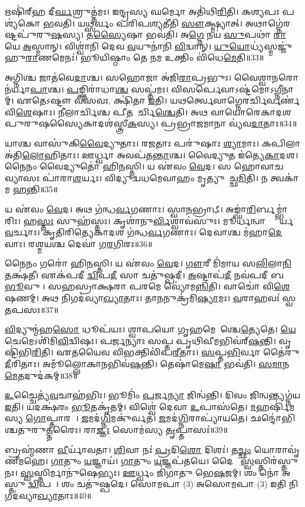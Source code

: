 𑌋𑌷𑌿॑𑌰𑍍‌𑌹 𑌦𑍀\ul{𑌰𑍍𑌘}𑌶𑍍𑌰𑍁𑌤𑍍𑌤॑𑌮𑌃। 𑌇𑌨𑍍𑌦𑍍𑌰𑌸𑍍𑌯 𑌘𑌰𑍍𑌮𑍋 𑌅𑌤𑌿॑𑌥𑌿\ul{𑌰𑌿}𑌤𑌿। 
𑌕𑌶𑍍𑌯𑌪𑌃 𑌪𑌶𑍍𑌯॑𑌕𑍋 \ul{𑌭}𑌵𑌤𑌿। 𑌯𑌥𑍍𑌸𑌰𑍍𑌵𑌂 𑌪𑌰𑌿𑌪𑌶𑍍𑌯𑌤𑍀॑𑌤𑌿 \ul{𑌸𑍗}𑌕𑍍𑌷𑍍𑌮𑍍𑌯𑌾𑌤𑍍‌। 
𑌅𑌥𑌾𑌗𑍍𑌨𑍇॑𑌰𑌷𑍍𑌟𑌪𑍁॑𑌰𑍁\ul{𑌷}𑌸𑍍𑌯। 𑌤\ul{𑌸𑍍𑌯𑍈}𑌷𑌾 𑌭𑌵॑𑌤𑌿। 
𑌅\ul{𑌗𑍍𑌨𑍇} 𑌨𑌯॑ \ul{𑌸𑍁}𑌪𑌥𑌾॑ \ul{𑌰𑌾}𑌯𑍇 \ul{𑌅}𑌸𑍍𑌮𑌾𑌨𑍍‌। 𑌵𑌿𑌶𑍍𑌵𑌾॑𑌨𑌿 𑌦𑍇𑌵 \ul{𑌵}𑌯𑍁𑌨𑌾॑𑌨𑌿 \ul{𑌵𑌿}𑌦𑍍𑌵𑌾𑌨𑍍‌। 
\ul{𑌯𑍁}\ul{𑌯𑍋}𑌧𑍍𑌯॑𑌸𑍍𑌮𑌜𑍍𑌜𑍁॑𑌹𑍁\ul{𑌰𑌾}𑌣𑌮𑍇𑌨𑌃॑। 𑌭𑍂𑌯𑌿𑌷𑍍𑌠𑌾𑌂 𑌤𑍇 𑌨𑌮 𑌉𑌕𑍍𑌤𑌿𑌂 𑌵𑌿॑𑌧𑍇\ul{𑌮𑍇}𑌤𑌿॥33॥\anuvakamend


𑌅𑌗𑍍𑌨𑌿𑌶𑍍𑌚 𑌜𑌾𑌤॑𑌵𑍇\ul{𑌦𑌾}𑌶𑍍𑌚। 𑌸𑌹𑍋𑌜𑌾 𑌅॑𑌜𑌿\ul{𑌰𑌾}𑌪𑍍𑌰𑌭𑍁𑌃। 𑌵𑍈𑌶𑍍𑌵𑌾𑌨𑌰𑍋 𑌨॑𑌰𑍍𑌯𑌾\ul{𑌪𑌾}𑌶𑍍𑌚। 
\ul{𑌪}𑌙𑍍𑌕𑍍𑌤𑌿𑌰𑌾॑𑌧𑌾\ul{𑌶𑍍𑌚} 𑌸𑌪𑍍𑌤॑𑌮𑌃। 𑌵𑌿𑌸𑌰𑍍𑌪𑍇𑌵𑌾𑌽𑌷𑍍𑌟॑𑌮𑍋𑌽\ul{𑌗𑍍𑌨𑍀}𑌨𑌾𑌮𑍍‌। 
𑌏𑌤𑍇𑌽𑌷𑍍𑌟𑍗 𑌵𑌸𑌵𑌃, 𑌕𑍍𑌷𑌿॑𑌤𑌾 \ul{𑌇}𑌤𑌿। 𑌯𑌥𑌰𑍍𑌤𑍍𑌵𑍇𑌵𑌾𑌗𑍍𑌨𑍇𑌰𑌰𑍍𑌚𑌿𑌰𑍍𑌵𑌰𑍍𑌣॑𑌵𑌿\ul{𑌶𑍇}𑌷𑌾𑌃। 
𑌨𑍀𑌲𑌾𑌰𑍍𑌚𑌿𑌶𑍍𑌚 𑌪𑍀𑌤𑌕𑌾᳚𑌰𑍍𑌚𑌿\ul{𑌶𑍍𑌚𑍇}𑌤𑌿। 𑌅𑌥 𑌵𑌾𑌯𑍋𑌰𑍇𑌕𑌾𑌦𑌶𑌪𑍁𑌰𑍁𑌷𑌸𑍍𑌯𑍈𑌕𑌾\-𑌦𑌶॑𑌸𑍍𑌤𑍍𑌰𑍀\ul{𑌕}𑌸𑍍𑌯। 
𑌪𑍍𑌰𑌭𑍍𑌰𑌾𑌜𑌮𑌾𑌨𑌾 𑌵𑍍𑌯॑𑌵\ul{𑌦𑌾}𑌤𑌾𑌃॥34॥


𑌯𑌾𑌶𑍍𑌚 𑌵𑌾𑌸𑍁॑𑌕𑌿\ul{𑌵𑍈}𑌦𑍍𑌯𑍁𑌤𑌾𑌃। 𑌰𑌜𑌤𑌾𑌃 𑌪𑌰𑍁॑𑌷𑌾𑌃 \ul{𑌶𑍍𑌯𑌾}𑌮𑌾𑌃। 𑌕𑌪𑌿𑌲𑌾 𑌅॑𑌤𑌿\ul{𑌲𑍋}𑌹𑌿𑌤𑌾𑌃। 
𑌊𑌰𑍍𑌧𑍍𑌵𑌾 𑌅𑌵𑌪॑𑌤\ul{𑌨𑍍𑌤𑌾}𑌶𑍍𑌚। 𑌵𑍈𑌦𑍍𑌯𑍁𑌤 𑌇॑𑌤𑍍𑌯𑍇\ul{𑌕𑌾}𑌦𑌶। 𑌨𑍈𑌨𑌂 𑌵𑍈𑌦𑍍𑌯𑍁𑌤𑍋॑ 𑌹𑌿\ul{𑌨}𑌸𑍍𑌤𑌿। 
𑌯 𑌏॑𑌵𑌂 \ul{𑌵𑍇}𑌦। 𑌸 𑌹𑍋𑌵𑌾𑌚 𑌵𑍍𑌯𑌾𑌸𑌃 𑌪𑌾॑𑌰𑌾\ul{𑌶}𑌰𑍍𑌯𑌃। 
𑌵𑌿𑌦𑍍𑌯𑍁𑌦𑍍𑌵𑌧𑌮𑍇𑌵𑌾𑌹𑌂 𑌮𑍃𑌤𑍍𑌯𑍁𑌮𑍈᳚𑌚𑍍𑌛\ul{𑌮𑌿}𑌤𑌿। 𑌨 𑌤𑍍𑌵𑌕𑌾॑𑌮 \ul{𑌹}𑌨𑍍𑌤𑌿॥35॥


𑌯 𑌏॑𑌵𑌂 \ul{𑌵𑍇}𑌦। 𑌅𑌥 𑌗॑𑌨𑍍𑌧\ul{𑌰𑍍𑌵}𑌗𑌣𑌾𑌃। 𑌸𑍍𑌵𑌾\ul{𑌨}𑌭𑍍𑌰𑌾𑌟𑍍‌। 
𑌅𑌙𑍍𑌘𑌾॑\ul{𑌰𑌿}𑌰𑍍𑌬𑌮𑍍𑌭𑌾॑𑌰𑌿𑌃। 𑌹\ul{𑌸𑍍𑌤𑌃} 𑌸𑍁𑌹॑𑌸𑍍𑌤𑌃। 𑌕𑍃𑌶𑌾॑𑌨𑍁\ul{𑌰𑍍𑌵𑌿}𑌶𑍍𑌵𑌾𑌵॑𑌸𑍁𑌃। 
𑌮𑍂𑌰𑍍𑌧𑌨𑍍𑌵𑌾𑌨𑍍𑌥𑍍𑌸𑍂᳚𑌰𑍍𑌯\ul{𑌵}𑌰𑍍𑌚𑌾𑌃। 𑌕𑍃𑌤𑌿𑌰𑌿𑌤𑍍𑌯𑍇𑌕𑌾𑌦𑌶 𑌗॑𑌨𑍍𑌧\ul{𑌰𑍍𑌵}𑌗𑌣𑌾𑌃। 
𑌦𑍇𑌵𑌾𑌶𑍍𑌚 𑌮॑𑌹𑌾\ul{𑌦𑍇}𑌵𑌾𑌃। 𑌰𑌶𑍍𑌮𑌯𑌶𑍍𑌚 𑌦𑍇𑌵𑌾॑ 𑌗\ul{𑌰}𑌗𑌿𑌰𑌃॥36॥


𑌨𑍈𑌨𑌂 𑌗𑌰𑍋॑ 𑌹𑌿\ul{𑌨}𑌸𑍍𑌤𑌿। 𑌯 𑌏॑𑌵𑌂 \ul{𑌵𑍇}𑌦। 
\ul{𑌗𑍗}𑌰𑍀 𑌮𑌿॑𑌮𑌾𑌯 𑌸\ul{𑌲𑌿}𑌲𑌾\ul{𑌨𑌿} 𑌤𑌕𑍍𑌷॑𑌤𑍀। 𑌏𑌕॑𑌪𑌦𑍀 \ul{𑌦𑍍𑌵𑌿}𑌪\ul{𑌦𑍀} 𑌸𑌾 𑌚𑌤𑍁॑𑌷𑍍𑌪𑌦𑍀। 
\ul{𑌅}𑌷𑍍𑌟𑌾𑌪॑\ul{𑌦𑍀} 𑌨𑌵॑𑌪𑌦𑍀 𑌬\ul{𑌭𑍂}𑌵𑍁𑌷𑍀᳚। 𑌸𑌹𑌸𑍍𑌰𑌾𑌕𑍍𑌷𑌰𑌾 𑌪𑌰𑌮𑍇 𑌵𑍍𑌯𑍋॑𑌮\ul{𑌨𑍍𑌨𑌿}𑌤𑌿। 
𑌵𑌾𑌚𑍋॑ 𑌵𑌿\ul{𑌶𑍇}𑌷𑌣𑌮𑍍‌। 𑌅𑌥 𑌨𑌿𑌗𑌦॑𑌵𑍍𑌯𑌾\ul{𑌖𑍍𑌯𑌾}𑌤𑌾𑌃। 
𑌤𑌾𑌨𑌨𑍁𑌕𑍍𑌰॑𑌮𑌿\ul{𑌷𑍍𑌯𑌾}𑌮𑌃। \ul{𑌵}𑌰𑌾𑌹𑌵𑌃॑ 𑌸𑍍𑌵\ul{𑌤}𑌪𑌸𑌃॥37॥

\ul{𑌵𑌿}𑌦𑍍𑌯𑍁𑌨𑍍𑌮॑𑌹\ul{𑌸𑍋} 𑌧𑍂𑌪॑𑌯𑌃। 𑌶𑍍𑌵𑌾𑌪𑌯𑍋 𑌗𑍃𑌹𑌮𑍇𑌧𑌾᳚𑌶𑍍𑌚𑍇\ul{𑌤𑍍𑌯𑍇}𑌤𑍇। 
\ul{𑌯𑍇} 𑌚𑍇𑌮𑍇𑌽𑌶𑌿॑𑌮𑌿\ul{𑌵𑌿}\-𑌦𑍍𑌵𑌿𑌷𑌃। 𑌪𑌰𑍍𑌜𑌨𑍍𑌯𑌾𑌃 𑌸𑌪𑍍𑌤 𑌪𑍃𑌥𑌿𑌵𑍀𑌮𑌭𑌿𑌵॑𑌰𑍍‌\ul{𑌷}𑌨𑍍𑌤𑌿। 
𑌵𑍃𑌷𑍍𑌟𑌿॑𑌭𑌿\ul{𑌰𑌿}𑌤𑌿। 𑌏𑌤𑌯𑍈𑌵 𑌵𑌿𑌭𑌕𑍍𑌤𑌿𑌵𑌿॑𑌪\ul{𑌰𑍀}𑌤𑌾𑌃। \ul{𑌸}𑌪𑍍𑌤\ul{𑌭𑌿}𑌰𑍍𑌵𑌾 𑌤𑍈॑𑌰𑍁\ul{𑌦𑍀}𑌰𑌿𑌤𑌾𑌃। 
𑌅𑌮𑍂𑌁𑌲𑍍𑌲𑍋𑌕𑌾𑌨\-𑌭𑌿𑌵॑\ur{}\ul{𑌷}𑌨𑍍𑌤𑌿। 𑌤𑍇𑌷𑌾॑𑌮𑍇\ul{𑌷𑌾} 𑌭𑌵॑𑌤𑌿। \ul{𑌸}\ul{𑌮𑌾}𑌨\ul{𑌮𑍇}𑌤𑌦𑍁𑌦॑𑌕𑌮𑍍‌॥38॥

\ul{𑌉}𑌚𑍍𑌚𑍈𑌤𑍍𑌯॑\ul{𑌵}𑌚𑌾𑌹॑𑌭𑌿𑌃। 𑌭𑍂𑌮𑌿𑌂॑ \ul{𑌪}𑌰𑍍𑌜\ul{𑌨𑍍𑌯𑌾} 𑌜𑌿𑌨𑍍𑌵॑𑌨𑍍𑌤𑌿। 𑌦𑌿𑌵𑌂 𑌜𑌿𑌨𑍍𑌵𑌨𑍍𑌤𑍍𑌯𑌗𑍍𑌨॑𑌯 \ul{𑌇}𑌤𑌿। 
𑌯𑌦𑌕𑍍𑌷॑𑌰𑌂 \ul{𑌭𑍂}𑌤𑌕𑍃॑𑌤𑌮𑍍‌। 𑌵𑌿𑌶𑍍𑌵𑍇॑ 𑌦𑍇𑌵𑌾 \ul{𑌉}𑌪𑌾𑌸॑𑌤𑍇। \ul{𑌮}𑌹𑌰𑍍\mbox{}𑌷𑌿॑𑌮𑌸𑍍𑌯 \ul{𑌗𑍋}𑌪𑍍𑌤𑌾𑌰𑌮𑍍᳚। 
\ul{𑌜}𑌮𑌦॑\ul{𑌗𑍍𑌨𑌿}𑌮𑌕𑍁॑𑌰𑍍𑌵𑌤। \ul{𑌜}𑌮𑌦॑\ul{𑌗𑍍𑌨𑌿}\-𑌰𑌾𑌪𑍍𑌯𑌾॑𑌯𑌤𑍇। 
𑌛𑌨𑍍𑌦𑍋॑𑌭𑌿𑌶𑍍𑌚𑌤𑍁𑌰𑍁\ul{𑌤𑍍𑌤}𑌰𑍈𑌃। 𑌰𑌾\ul{𑌜𑍍𑌞𑌃} 𑌸𑍋𑌮॑𑌸𑍍𑌯 \ul{𑌤𑍃}𑌪𑍍𑌤𑌾𑌸𑌃॑॥39॥

𑌬𑍍𑌰𑌹𑍍𑌮॑𑌣𑌾 \ul{𑌵𑍀}𑌰𑍍𑌯𑌾॑𑌵𑌤𑌾। \ul{𑌶𑌿}𑌵𑌾 𑌨𑌃॑ \ul{𑌪𑍍𑌰}𑌦𑌿\ul{𑌶𑍋} 𑌦𑌿𑌶𑌃॑। 
𑌤\ul{𑌚𑍍𑌛𑌂} 𑌯𑍋𑌰𑌾𑌵𑍃॑𑌣𑍀𑌮𑌹𑍇। \ul{𑌗𑌾}𑌤𑍁𑌂 \ul{𑌯}𑌜𑍍𑌞𑌾𑌯॑। \ul{𑌗𑌾}𑌤𑍁𑌂 \ul{𑌯}𑌜𑍍𑌞𑌪॑𑌤𑌯𑍇। 
𑌦𑍈𑌵𑍀𑌃᳚ \ul{𑌸𑍍𑌵}𑌸𑍍𑌤𑌿𑌰॑𑌸𑍍𑌤𑍁 𑌨𑌃। \ul{𑌸𑍍𑌵}𑌸𑍍𑌤𑌿𑌰𑍍𑌮𑌾𑌨𑍁॑𑌷𑍇𑌭𑍍𑌯𑌃। \ul{𑌊}𑌰𑍍𑌧𑍍𑌵𑌂 𑌜𑌿॑𑌗𑌾𑌤𑍁 𑌭𑍇\ul{𑌷}𑌜𑌮𑍍। 
𑌶𑌂 𑌨𑍋॑ 𑌅𑌸𑍍𑌤𑍁 \ul{𑌦𑍍𑌵𑌿}𑌪𑌦𑍇᳚। 𑌶𑌂 𑌚𑌤𑍁॑𑌷𑍍𑌪𑌦𑍇। 
𑌸𑍋𑌮𑌪𑌾 (3) 𑌅𑌸𑍋𑌮𑌪𑌾 (3) 𑌇𑌤𑌿 𑌨𑌿𑌗𑌦॑𑌵𑍍𑌯𑌾\ul{𑌖𑍍𑌯𑌾}𑌤𑌾𑌃॥40॥\anuvakamend


